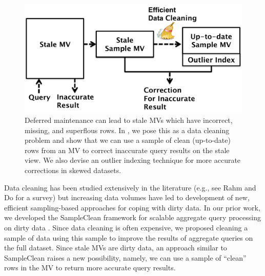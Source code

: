 \begin{figure}[t] \vspace{-2em}
\centering
 \includegraphics[scale=0.25]{figs/sys-arch.pdf} \vspace{-.25em}
 \caption{Deferred maintenance can lead to stale MVs which have incorrect, missing, and superflous rows. In \svc, we pose this as a data cleaning problem and show that we can use a sample of clean (up-to-date) rows from an MV to correct inaccurate query results on the stale view. We also devise an outlier indexing technique for more accurate corrections in skewed datasets. \label{sys-arch}}\vspace{-1.75em}
\end{figure}

Data cleaning has been studied extensively in the literature (e.g., see Rahm and Do for a survey\cite{rahm2000data}) but increasing data volumes have led to development of new, efficient sampling-based approaches for coping with dirty data.   
In our prior work, we developed the SampleClean framework for scalable aggregate query processing on dirty data \cite{wang1999sample}.
Since data cleaning is often expensive, we proposed cleaning a sample of data using this sample to improve the results of aggregate queries on the full dataset.
Since stale MVs are dirty data, an approach similar to SampleClean raises a new possibility, namely, we can use a sample of ``clean'' rows in the MV to return more accurate query results.

